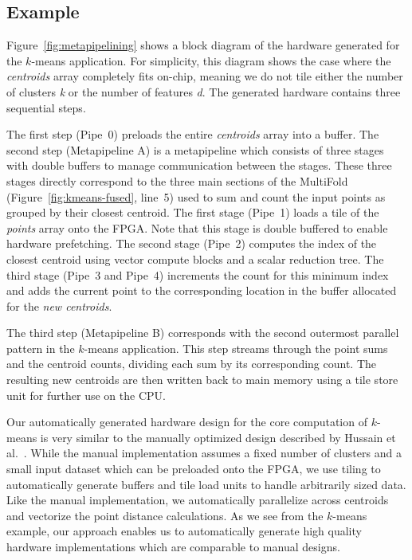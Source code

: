 \subsection{Example}
Figure~\ref{fig:metapipelining} shows a block diagram of the hardware generated for the $k$-means application.
For simplicity, this diagram shows the case where the \emph{centroids} array completely fits on-chip, meaning
we do not tile either the number of clusters \emph{k} or the number of features \emph{d}.
The generated hardware contains three sequential steps.

The first step (Pipe~0) preloads the entire \emph{centroids} array into a buffer.
The second step (Metapipeline A) is a metapipeline which consists of three stages with double buffers to manage communication between the stages.
These three stages directly correspond to the three main sections of the MultiFold (Figure~\ref{fig:kmeans-fused}, line~5) used to sum and count the input points as grouped by their
closest centroid. The first stage (Pipe~1) loads a tile of the \emph{points} array onto the FPGA. Note that this stage is double buffered to
enable hardware prefetching. The second stage (Pipe~2) computes the index of the closest centroid using vector compute blocks and a scalar reduction
tree. The third stage (Pipe~3 and Pipe~4) increments the count for this minimum index and adds the current point to the corresponding location in the
buffer allocated for the \emph{new centroids}.

The third step (Metapipeline B) corresponds with the second outermost parallel pattern in the $k$-means application.
This step streams through the point sums and the centroid counts, dividing each sum by its corresponding count. The resulting new centroids
are then written back to main memory using a tile store unit for further use on the CPU.

Our automatically generated hardware design for the core computation of $k$-means is very similar to the manually optimized design described by Hussain et al.~\cite{hwkmeans}.
While the manual implementation assumes a fixed number of clusters and a small input dataset which can be preloaded onto the FPGA, we use tiling to automatically generate
buffers and tile load units to handle arbitrarily sized data. Like the manual implementation, we automatically parallelize across centroids
and vectorize the point distance calculations. As we see from the $k$-means example, our approach enables us to automatically generate high quality hardware implementations which are comparable to manual designs.
